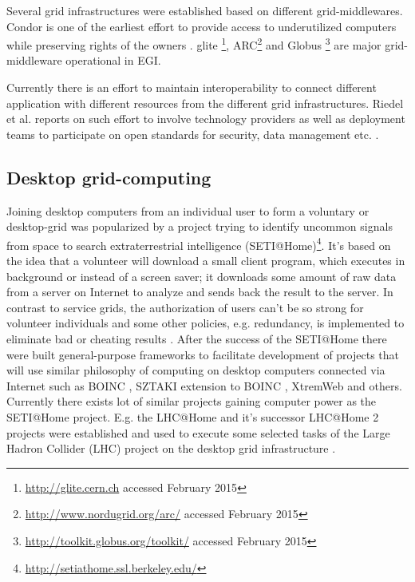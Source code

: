 Several grid infrastructures were established based on different grid-middlewares.
Condor is one of the earliest effort to provide access to underutilized computers while preserving rights of the owners \cite{Litzkow1990}. glite \cite{Laure2006}\footnote{\url{http://glite.cern.ch} accessed February 2015}, ARC\footnote{\url{http://www.nordugrid.org/arc/} accessed February 2015} and Globus \cite{Foster1997}\footnote{\url{http://toolkit.globus.org/toolkit/} accessed February 2015} are major grid-middleware operational in EGI.

Currently there is an effort to maintain interoperability to connect different application with different resources from the different grid infrastructures. Riedel et al. reports on such effort to involve technology providers as well as deployment teams to participate on open standards for security, data management etc. \cite{Riedel2009}.

\subsection{Desktop grid-computing}
\label{sec:desktopgrid}
Joining desktop computers from an individual user to form a voluntary or desktop-grid was popularized by a project trying to identify uncommon signals from space to search extraterrestrial intelligence (SETI@Home)\footnote{\url{http://setiathome.ssl.berkeley.edu/}}. It's based on the idea that a volunteer will download a small client program, which executes in background or instead of a screen saver; it downloads some amount of raw data from a server on Internet to analyze and sends back the result to the server. In contrast to service grids, the authorization of users can't be so strong for volunteer individuals and some other policies, e.g. redundancy, is implemented to eliminate bad or cheating results \cite{Anderson2002}. After the success of the SETI@Home there were built general-purpose frameworks to facilitate development of projects that will use similar philosophy of computing on desktop computers connected via Internet such as BOINC \cite{Anderson2004}, SZTAKI extension to BOINC \cite{Balaton2007,Kacsuk2009}, XtremWeb \cite{Fedak2001} and others. Currently there exists lot of similar projects gaining computer power as the SETI@Home project. E.g. the LHC@Home and it's successor LHC@Home 2 projects were established and used to execute some selected tasks of the Large Hadron Collider (LHC) project on the desktop grid infrastructure \cite{Herr2006,Hoimyr2012}.

